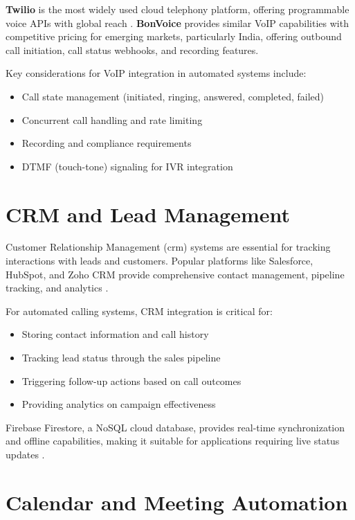 \documentclass[12pt,a4paper,oneside]{book}
\begin{document}
\textbf{Twilio} is the most widely used cloud telephony platform, offering programmable voice APIs with global reach \citep{twilio2024}. \textbf{BonVoice} provides similar VoIP capabilities with competitive pricing for emerging markets, particularly India, offering outbound call initiation, call status webhooks, and recording features.

Key considerations for VoIP integration in automated systems include:
\begin{itemize}
    \item Call state management (initiated, ringing, answered, completed, failed)
    \item Concurrent call handling and rate limiting
    \item Recording and compliance requirements
    \item DTMF (touch-tone) signaling for IVR integration
\end{itemize}

\section{CRM and Lead Management}

Customer Relationship Management (\gls{crm}) systems are essential for tracking interactions with leads and customers. Popular platforms like Salesforce, HubSpot, and Zoho CRM provide comprehensive contact management, pipeline tracking, and analytics \citep{buttle2019crm}.

For automated calling systems, CRM integration is critical for:
\begin{itemize}
    \item Storing contact information and call history
    \item Tracking lead status through the sales pipeline
    \item Triggering follow-up actions based on call outcomes
    \item Providing analytics on campaign effectiveness
\end{itemize}

Firebase Firestore, a NoSQL cloud database, provides real-time synchronization and offline capabilities, making it suitable for applications requiring live status updates \citep{firebase2024}.

\section{Calendar and Meeting Automation}
\end{document}
